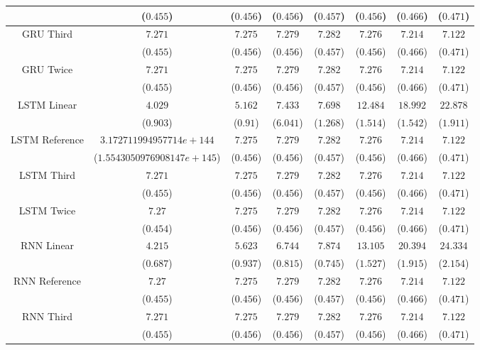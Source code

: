 \begin{table}[!ht]
{\begin{tabular}{|c|c|c|c|c|c|c|c|}
			 & ($0.455$) & ($0.456$) & ($0.456$) & ($0.457$) & ($0.456$) & ($0.466$) & ($0.471$) \\ \hline
			\multirow{2}{*}{GRU Third} & $7.271$ & $7.275$ & $7.279$ & $7.282$ & $7.276$ & $7.214$ & $7.122$ \\
			 & ($0.455$) & ($0.456$) & ($0.456$) & ($0.457$) & ($0.456$) & ($0.466$) & ($0.471$) \\ \hline
			\multirow{2}{*}{GRU Twice} & $7.271$ & $7.275$ & $7.279$ & $7.282$ & $7.276$ & $7.214$ & $7.122$ \\
			 & ($0.455$) & ($0.456$) & ($0.456$) & ($0.457$) & ($0.456$) & ($0.466$) & ($0.471$) \\ \hline
			\multirow{2}{*}{LSTM Linear} & $4.029$ & $5.162$ & $7.433$ & $7.698$ & $12.484$ & $18.992$ & $22.878$ \\
			 & ($0.903$) & ($0.91$) & ($6.041$) & ($1.268$) & ($1.514$) & ($1.542$) & ($1.911$) \\ \hline
			\multirow{2}{*}{LSTM Reference} & $3.172711994957714e+144$ & $7.275$ & $7.279$ & $7.282$ & $7.276$ & $7.214$ & $7.122$ \\
			 & ($1.5543050976908147e+145$) & ($0.456$) & ($0.456$) & ($0.457$) & ($0.456$) & ($0.466$) & ($0.471$) \\ \hline
			\multirow{2}{*}{LSTM Third} & $7.271$ & $7.275$ & $7.279$ & $7.282$ & $7.276$ & $7.214$ & $7.122$ \\
			 & ($0.455$) & ($0.456$) & ($0.456$) & ($0.457$) & ($0.456$) & ($0.466$) & ($0.471$) \\ \hline
			\multirow{2}{*}{LSTM Twice} & $7.27$ & $7.275$ & $7.279$ & $7.282$ & $7.276$ & $7.214$ & $7.122$ \\
			 & ($0.454$) & ($0.456$) & ($0.456$) & ($0.457$) & ($0.456$) & ($0.466$) & ($0.471$) \\ \hline
			\multirow{2}{*}{RNN Linear} & $4.215$ & $5.623$ & $6.744$ & $7.874$ & $13.105$ & $20.394$ & $24.334$ \\
			 & ($0.687$) & ($0.937$) & ($0.815$) & ($0.745$) & ($1.527$) & ($1.915$) & ($2.154$) \\ \hline
			\multirow{2}{*}{RNN Reference} & $7.27$ & $7.275$ & $7.279$ & $7.282$ & $7.276$ & $7.214$ & $7.122$ \\
			 & ($0.455$) & ($0.456$) & ($0.456$) & ($0.457$) & ($0.456$) & ($0.466$) & ($0.471$) \\ \hline
			\multirow{2}{*}{RNN Third} & $7.271$ & $7.275$ & $7.279$ & $7.282$ & $7.276$ & $7.214$ & $7.122$ \\
			 & ($0.455$) & ($0.456$) & ($0.456$) & ($0.457$) & ($0.456$) & ($0.466$) & ($0.471$) \\ \hline

\end{tabular}}
\end{table}
